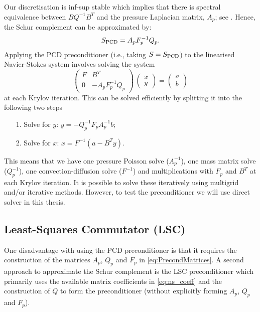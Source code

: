 Our discretisation is inf-sup stable which implies that there is spectral equivalence between $BQ^{-1}B^T$ and the pressure Laplacian matrix, $A_p$; see \cite[Section 5.5.1]{elman2005finite}. Hence, the Schur complement can be approximated by:
$$S_{\rm PCD} =A_p F_p^{-1}Q_p.$$
Applying the PCD preconditioner (i.e., taking $S = S_{\rm PCD}$) to the linearised Navier-Stokes system involves solving the system
\begin{equation} \nonumber
\left(
\begin{array}{cc}
F & B^T \\
0 & -A_p F_p^{-1}Q_p
\end{array}
\right)
\,
\left(
\begin{array}{c}
x \\
y
\end{array}
\right) =
\left(
\begin{array}{c}a\\b
\end{array}
\right)
\end{equation}
at each Krylov iteration. This can be solved  efficiently by splitting it into the following two steps
\begin{itemize} \label{it:PCDsolve}
    \item[1.] Solve for $y$: $y = -Q_p^{-1}F_p A_p^{-1}b;$
    \item[2.] Solve for $x$: $x = F^{-1}(a-B^Ty).$
\end{itemize}
This means that we have one pressure Poisson solve ($A_p^{-1}$), one mass matrix solve ($Q_p^{-1}$), one convection-diffusion solve ($F^{-1}$) and multiplications with $F_p$ and $B^T$ at each Krylov iteration. It is possible to solve these iteratively using multigrid and/or iterative methods. However, to test the preconditioner we will use direct solver in this thesis.

\subsection{Least-Squares Commutator (LSC)}
\label{sec:LSC_outline}

One disadvantage with using the PCD preconditioner is that it requires the construction of the matrices $A_p$, $Q_p$ and $F_p$ in \eqref{eq:PrecondMatrices}. A second approach to approximate the Schur complement is the LSC preconditioner \cite[Chap. 8]{elman2005finite} which primarily uses the available matrix coefficients in \eqref{eq:ns_coeff} and the construction of $Q$ to form the preconditioner (without explicitly forming $A_p$, $Q_p$ and $F_p$).

